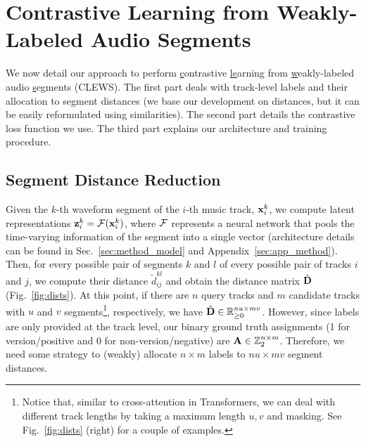 
\section{Contrastive Learning from Weakly-Labeled Audio Segments}

We now detail our approach to perform \underline{c}ontrastive \underline{le}arning from \underline{w}eakly-labeled audio \underline{s}egments (CLEWS). The first part deals with track-level labels and their allocation to segment distances (we base our development on distances, but it can be easily reformulated using similarities). The second part details the contrastive loss function we use. The third part explains our architecture and training procedure.

\subsection{Segment Distance Reduction}
\label{sec:method_segment}

Given the $k$-th waveform segment of the $i$-th music track, $\textbf{x}^k_i$, we compute latent representations $\textbf{z}^k_i=\mathcal{F}(\textbf{x}^k_i)$, where $\mathcal{F}$ represents a neural network that pools the time-varying information of the segment into a single vector (architecture details can be found in Sec.~\ref{sec:method_model} and Appendix~\ref{sec:app_method}). Then, for every possible pair of segments $k$ and $l$ of every possible pair of tracks $i$ and $j$, we compute their distance $\tilde{d}^{kl}_{ij}$ and obtain the distance matrix $\tilde{\textbf{D}}$ (Fig.~\ref{fig:dists}). At this point, if there are $n$ query tracks and $m$ candidate tracks with $u$ and $v$ segments\footnote{Notice that, similar to cross-attention in Transformers, we can deal with different track lengths by taking a maximum length $u,v$ and masking. See Fig.~\ref{fig:dists} (right) for a couple of examples.}, respectively, we have $\tilde{\textbf{D}} \in \mathbb{R}_{\ge 0}^{nu\times mv}$. However, since labels are only provided at the track level, our binary ground truth assignments (1 for version/positive and 0 for non-version/negative) are $\textbf{A} \in \mathbb{Z}_2^{n\times m}$. Therefore, we need some strategy to (weakly) allocate $n\times m$ labels to $nu\times mv$ segment distances.

